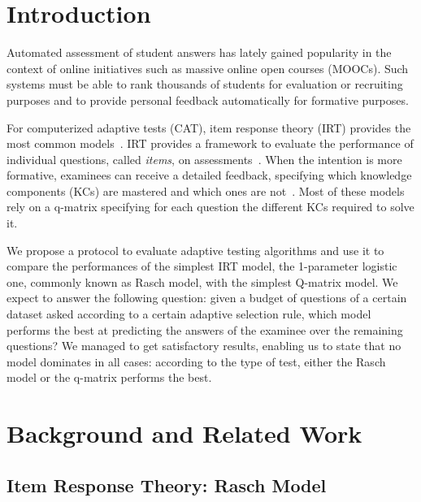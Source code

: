 \documentclass{edm_template}
\begin{document}

\section{Introduction}
Automated assessment of student answers has lately gained popularity in the context of online initiatives such as massive online open courses (MOOCs). Such systems must be able to rank thousands of students for evaluation or recruiting purposes and to provide personal feedback automatically for formative purposes.

For computerized adaptive tests (CAT), item response theory (IRT) provides the most common models~\cite{Desmarais2012}. IRT provides a framework to evaluate the performance of individual questions, called \emph{items}, on assessments~\cite{Hambleton1991}. When the intention is more formative, examinees can receive a detailed feedback, specifying which knowledge components (KCs) are mastered and which ones are not~\cite{Cheng2009}. Most of these models rely on a q-matrix specifying for each question the different KCs required to solve it.

We propose a protocol to evaluate adaptive testing algorithms and use it to compare the performances of the simplest IRT model, the 1-parameter logistic one, commonly known as Rasch model, with the simplest Q-matrix model. We expect to answer the following question: given a budget of questions of a certain dataset asked according to a certain adaptive selection rule, which model performs the best at predicting the answers of the examinee over the remaining questions? We managed to get satisfactory results, enabling us to state that no model dominates in all cases: according to the type of test, either the Rasch model or the q-matrix performs the best.


\section{Background and Related Work}

\subsection{Item Response Theory: Rasch Model}
\end{document}
